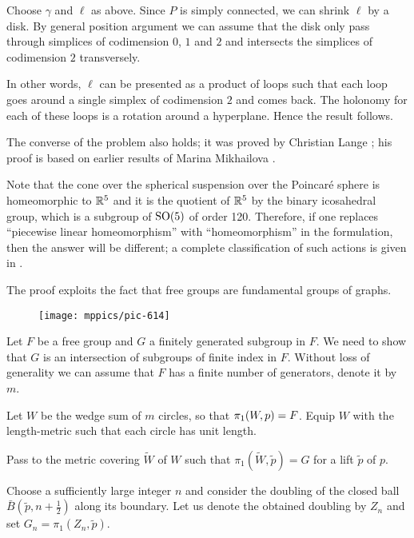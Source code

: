 Choose $\gamma$ and $\ell$ as above.
Since $P$ is simply connected, we can shrink $\ell$ by a disk.
By general position argument we can assume that the disk 
only pass through simplices of codimension $0$, $1$ and $2$
and intersects the simplices of codimension $2$ transversely.

In other words, $\ell$ can be presented as a product of 
loops such that each loop goes around a single simplex of codimension $2$ and comes back.
The holonomy for each of these loops is a rotation around a hyperplane.
Hence the result follows.
\qeds

The converse of the problem also holds;
it was proved by Christian Lange \cite{lange};
his proof is based on earlier results of 
Marina Mikhailova \cite{mikhailova}.

Note that the cone over the spherical suspension over the Poincar\'e sphere is homeomorphic to $\mathbb{R}^5$ and it is the quotient of $\mathbb{R}^5$ by the binary icosahedral group, which is a subgroup of $\mathrm{SO}(5)$ of order 120. 
Therefore, 
if one replaces ``piecewise linear homeomorphism'' with ``homeomorphism'' in the formulation, 
then the answer will be different; 
a complete classification of such actions is given in \cite{lange}.

The proof exploits the fact that free groups are fundamental groups of graphs.


\begin{wrapfigure}{o}{38 mm}
\vskip-4mm
\centering
\texttt{[image: mppics/pic-614]}
\end{wrapfigure}

\medskip

Let $F$ be a free group and $G$ a finitely generated subgroup in $F$.
We need to show that $G$ is an intersection of subgroups of finite index in $F$.
Without loss of generality we can assume that $F$ has a finite number of generators, denote it by $m$.

Let $W$ be the wedge sum of $m$ circles, 
so that $\pi_1(W,p)\z=F$.
Equip $W$ with the length-metric 
such that each circle has unit length.

Pass to the metric covering $\tilde W$ of $W$ 
such that  $\pi_1(\tilde W,\tilde p)=G$ 
for a lift $\tilde p$ of $p$.

Choose a sufficiently large integer $n$ and consider the doubling of the closed ball $\bar B(\tilde p,n+\frac12)$ along  its boundary.
Let us denote the obtained doubling by $Z_n$ and set $G_n=\pi_1(Z_n,\tilde p)$.

